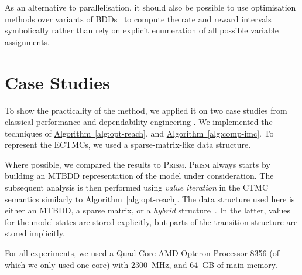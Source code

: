 \documentclass[10pt,twocolumn]{article}
\newcommand{\PRISM}{\textsc{Prism}\xspace}
\newcommand{\refalg}[1]{\texorpdfstring{\hyperref[alg:#1]{Algorithm~\ref*{alg:#1}}}{Algorithm~\ref*{alg:#1}}}
\begin{document}
As an alternative to parallelisation, it should also be possible to
use optimisation methods over variants of
BDDs~\cite{LaiPV94,Knuth09,OssowskiB06,WanCM11} to compute the rate
and reward intervals symbolically rather than rely on explicit
enumeration of all possible variable assignments.

\section{Case Studies}
\label{sec:case-studies}
\noindent To show the practicality of the method, we applied it on two case
studies from classical performance and
dependability engineering \cite{HaverkortHK00,ClothH05}.
We implemented the techniques of \refalg{opt-reach}, and \refalg{comp-imc}.
To represent the ECTMCs, we used a sparse-matrix-like data structure.

Where possible, we compared the results to \PRISM.
\PRISM always starts by building an MTBDD representation of the model under consideration.
The subsequent analysis is then performed using \emph{value iteration} in the CTMC semantics similarly to \refalg{opt-reach}.
The data structure used here is either an MTBDD, a sparse matrix, or a \emph{hybrid} structure~\cite{KwiatkowskaNP04}.
In the latter, values for the model states are stored explicitly, but parts of the transition structure are stored implicitly.

For all experiments, we used a Quad-Core AMD Opteron\texttrademark{} Processor 8356 (of which we only used one core)
with 2300~MHz, and 64~GB of main memory.
\end{document}
